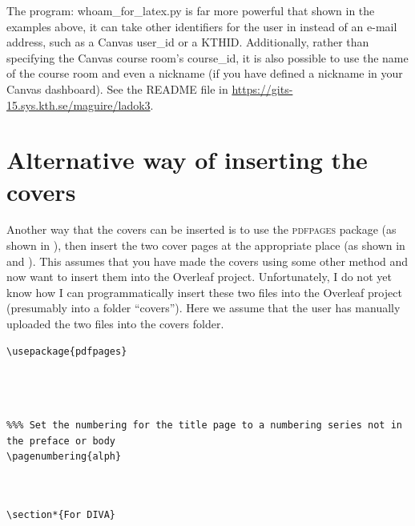 The program: whoam\_for\_latex.py is far more powerful that shown in the examples above, it can take other identifiers for the user in instead of an e-mail address, such as a Canvas user\_id or a KTHID. Additionally, rather than specifying the Canvas course room’s course\_id, it is also possible to use the name of the course room and even a nickname (if you have defined a nickname in your Canvas dashboard). See the README file in \url{https://gits-15.sys.kth.se/maguire/ladok3}.


\section{Alternative way of inserting the covers}
Another way that the covers can be inserted is to use the \textsc{pdfpages} package (as shown in ), then insert the two cover pages at the appropriate place (as shown in  and ). This assumes that you have made the covers using some other method and now want to insert them into the Overleaf project. Unfortunately, I do not yet know how I can programmatically insert these two files into the Overleaf project (presumably into a folder “covers”). Here we assume that the user has manually uploaded the two files into the covers folder.
\begin{lstlisting}[language={[LaTeX]TeX}, caption={Insert this include file either in the main text document or the includes.tex file}, label=lst:includeAfterHyperref]
% To use KTH pdf covers
\usepackage{pdfpages}


\end{lstlisting} 	
\begin{lstlisting}[language={[LaTeX]TeX}, caption={Insert the front cover before the title page}, label=lst:frontCover]
% Add front cover


%%% Set the numbering for the title page to a numbering series not in the preface or body
\pagenumbering{alph}
\end{lstlisting}

\begin{lstlisting}[language={[LaTeX]TeX}, caption={Insert the back cover page before the For DiVA section}, label=lst:backCover]
% Add back cover, unsure if this is supposed to be before or after the "For DiVA" pages


\section*{For DIVA}
\end{lstlisting}

